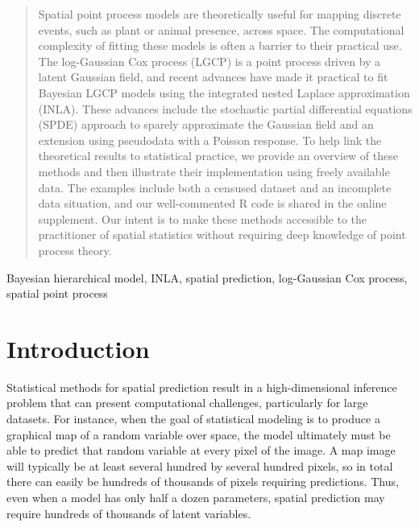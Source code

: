 \documentclass[]{interact}
\begin{document}
\begin{abstract}
Spatial point process models are theoretically useful for mapping discrete
events, such as plant or animal presence, across space. The computational
complexity of fitting these models is often a barrier to their practical use.
The log-Gaussian Cox process (LGCP) is a point process driven by a latent
Gaussian field, and recent advances have made it practical to fit Bayesian LGCP
models using the integrated nested Laplace approximation (INLA). These advances
include the stochastic partial differential equations (SPDE) approach to
sparely approximate the Gaussian field and an extension using pseudodata with
a Poisson response. To help link the theoretical results to statistical
practice, we provide an overview of these methods and then illustrate their
implementation using freely available data. The examples include both a
censused dataset and an incomplete data situation, and our well-commented R
code is shared in the online supplement. Our intent is to make these methods
accessible to the practitioner of spatial statistics without requiring deep
knowledge of point process theory.
\end{abstract}

\begin{keywords}
Bayesian hierarchical model, INLA, spatial prediction, log-Gaussian Cox process, spatial point process
\end{keywords}


\section{Introduction}
\label{intro}


Statistical methods for spatial prediction result in a high-dimensional
inference problem that can present computational challenges, particularly for
large datasets. For instance, when the goal of statistical modeling is to
produce a graphical map of a random variable over space, the model ultimately
must be able to predict that random variable at every pixel of the image. A map
image will typically be at least several hundred by several hundred pixels, so
in total there can easily be hundreds of thousands of pixels requiring
predictions. Thus, even when a model has only half a dozen parameters, spatial
prediction may require hundreds of thousands of latent variables.
\end{document}
